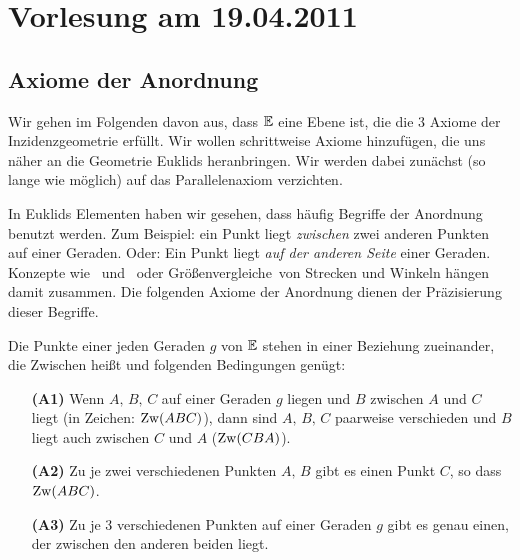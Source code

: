 \section*{Vorlesung am 19.04.2011}



\subsection*{Axiome der Anordnung}





Wir gehen im Folgenden davon aus, dass $\mathbb E$ eine Ebene ist, die die 3
Axiome der Inzidenzgeometrie erfüllt. Wir wollen schrittweise Axiome
hinzufügen, die uns näher an die Geometrie Euklids heranbringen.
Wir werden dabei zunächst (so lange wie möglich) auf das Parallelenaxiom verzichten.




In Euklids Elementen haben wir
gesehen, dass häufig Begriffe der Anordnung benutzt werden. 
Zum Beispiel: \glqq ein Punkt %
liegt {\em zwischen} zwei anderen Punkten %
auf einer Geraden\grqq . 
Oder: \glqq Ein Punkt %
liegt {\em auf der anderen Seite} einer Geraden\grqq .
Konzepte wie \grqq\  und \grqq\
oder \glqq Größenvergleiche\grqq\ von Strecken und Winkeln 
hängen damit zusammen.
Die folgenden Axiome der Anordnung dienen der Präzisierung dieser Begriffe.


Die Punkte einer jeden Geraden $g$ von $\mathbb E$ stehen in einer
Beziehung zueinander, die \glqq{}Zwischen\grqq{} hei{\ss}t
und folgenden Bedingungen gen\"{u}gt:

\begin{enumerate}
    \item[{\bf (A1)}] Wenn $A,\,B,\,C$ auf einer Geraden $g$ liegen und $B$ zwischen $A$ und $C$
    liegt (in Zeichen: $\operatorname{Zw}(ABC)$), dann sind $A,\,B,\,C$ paarweise
    verschieden und $B$ liegt auch zwischen $C$ und $A$ ($\operatorname{Zw}(CBA)$).
    \item[{\bf (A2)}] Zu je zwei verschiedenen Punkten $A,\,B$ gibt es
    einen Punkt $C$, so dass $\operatorname{Zw}(ABC)$.
    \item[{\bf (A3)}] Zu je 3 verschiedenen Punkten auf einer Geraden
    $g$ gibt es genau einen, der zwischen den anderen beiden
    liegt.
\end{enumerate}

